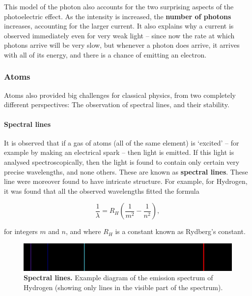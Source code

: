 \documentclass{article}
\begin{document}
This model of the photon also accounts for the two surprising aspects of the photoelectric effect. As the intensity is increased, the \textbf{number of photons} increases, accounting for the larger current. It also explains why a current is observed immediately even for very weak light -- since now the rate at which photons arrive will be very slow, but whenever a photon does arrive, it arrives with all of its energy, and there is a chance of emitting an electron.

\subsubsection{Atoms}\label{Atoms}

Atoms also provided big challenges for classical physics, from two completely different perspectives: The observation of spectral lines, and their stability.

\paragraph{Spectral lines}\label{Spectral lines}

It is observed that if a gas of atoms (all of the same element) is `excited' -- for example by making an electrical spark -- then light is emitted. If this light is analysed spectroscopically, then the light is found to contain only certain very precise wavelengths, and none others. These are known as \textbf{spectral lines}. These line were moreover found to have intricate structure. For example, for Hydrogen, it was found that all the observed wavelengths fitted the formula

\begin{equation}
\frac{1}{\lambda} = R_H \left(\frac{1}{m^2} - \frac{1}{n^2}\right),
\end{equation}

for integers $m$ and $n$, and where $R_H$ is a constant known as Rydberg's constant.

\begin{figure}[!htbp]
\centering
\includegraphics[width=0.7\linewidth]{files/Emission_spectrum-H-6d505e98609c696da227e308b0c50853.svg}
\caption[]{\textbf{Spectral lines.} Example diagram of the emission spectrum of Hydrogen (showing only lines in the visible part of the spectrum).}
\label{spectrum}
\end{figure}
\end{document}
